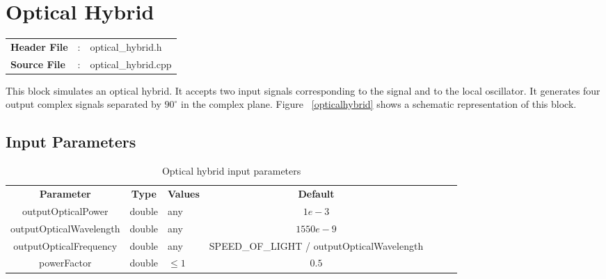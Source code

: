 \clearpage

\section{Optical Hybrid}

\begin{tcolorbox}	
	\begin{tabular}{p{2.75cm} p{0.2cm} p{10.5cm}} 	
		\textbf{Header File}   &:& optical\_hybrid.h \\
		\textbf{Source File}   &:& optical\_hybrid.cpp \\
	\end{tabular}
\end{tcolorbox}

This block simulates an optical hybrid. It accepts two input signals corresponding to the signal and to the local oscillator. It generates four output complex signals separated by $90^\circ$ in the complex plane. Figure ~\ref{opticalhybrid} shows a schematic representation of this block.


\subsection*{Input Parameters}

\begin{table}[h]
	\centering
	\begin{tabular}{|c|c|p{60mm}|c|ccp{60mm}}
		\cline{1-4}
		\textbf{Parameter} & \textbf{Type} & \textbf{Values} &   \textbf{Default}& \\ \cline{1-4}
		outputOpticalPower & double & any & $1e-3$ \\ \cline{1-4}
		outputOpticalWavelength & double & any & $1550e-9$ \\ \cline{1-4}
		outputOpticalFrequency & double & any & SPEED\_OF\_LIGHT / outputOpticalWavelength \\ \cline{1-4}
		powerFactor & double & $\leq 1$ & $0.5$ \\ \cline{1-4} 
	\end{tabular}
	\caption{Optical hybrid input parameters}
	\label{table:optical_hybrid_in_par}
\end{table}

